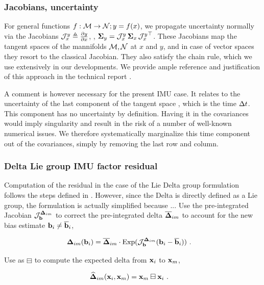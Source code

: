 \subsubsection{Jacobians, uncertainty}
\label{sec:uncertainty}

For general functions $f:\mathcal{M}\to\mathcal{N};y=f(x)$, we propagate uncertainty normally via the Jacobians ${\mathcal{J}^{y}_{x}}\triangleq\frac{\partial y}{\partial x}$, \ie, ${\bm \Sigma}_y={\mathcal{J}^{y}_{x}}\,{\bm \Sigma}_x\,{\mathcal{J}^{y}_{x}}^{\top}$. 
These Jacobians map the tangent spaces of the mannifolds $\mathcal{M},\mathcal{N}$ at $x$ and $y$, and in case of vector spaces they resort to the classical Jacobian.
They also satisfy the chain rule, which we use extensively in our developments.
We provide ample reference and justification of this approach in the technical report \cite{sola2018micro}.

A comment is however necessary for the present IMU case.
It relates to the uncertainty of the last component of the tangent space , which is the time $\Delta t$. This component has no uncertainty by definition. 
Having it in the covariances would imply singularity and result in the risk of a number of well-known numerical issues. 
We therefore systematically marginalize this time component out of the covariances, simply by removing the last row and column. 



\subsubsection{Delta Lie group IMU factor residual}
Computation of the residual in the case of the Lie Delta group formulation follows the steps defined in .
However, since the Delta is directly defined as a Lie group, the formulation is actually simplified because  ... 
Use the pre-integrated Jacobian ${\mathcal{J}^{{{\bm \Delta}}_{im}}_{{\bf b}}}$ to correct the pre-integrated delta $\overline{{{\bm \Delta}}}_{im}$ to account for the new bias estimate ${\bf b}_i\neq\overline{{\bf b}}_i$,

\begin{align}
    {{\bm \Delta}}_{im}({\bf b}_i) &= \overline{{{\bm \Delta}}}_{im}\cdot\operatorname*{Exp}({\mathcal{J}^{{{\bm \Delta}}_{im}}_{{\bf b}}}({\bf b}_i-\overline{{\bf b}}_i)) 
    ~.
\end{align}

Use  as $\boxminus$ to compute the expected delta from  ${\bf x}_i$ to ${\bf x}_m$,

\begin{align}
    \widehat{{{\bm \Delta}}}_{im}({\bf x}_i,{\bf x}_m) &= {\bf x}_m \boxminus {\bf x}_i 
    ~.
\end{align}

